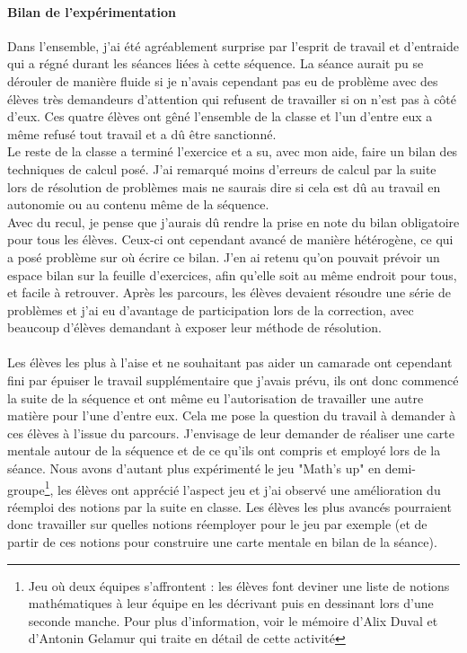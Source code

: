 \paragraph{Bilan de l'expérimentation\\}
Dans l'ensemble, j'ai été agréablement surprise par l'esprit de travail et d'entraide qui a régné durant les séances liées à cette séquence. La séance aurait pu se dérouler de manière fluide si je n'avais cependant pas eu de problème avec des élèves très demandeurs d'attention qui refusent de travailler si on n'est pas à côté d'eux. Ces quatre élèves ont gêné l'ensemble de la classe et l'un d'entre eux a même refusé tout travail et a dû être sanctionné.\\
Le reste de la classe a terminé l'exercice et a su, avec mon aide, faire un bilan des techniques de calcul posé. J'ai remarqué moins d'erreurs de calcul par la suite lors de résolution de problèmes mais ne saurais dire si cela est dû au travail en autonomie ou au contenu même de la séquence.\\
Avec du recul, je pense que j'aurais dû rendre la prise en note du bilan obligatoire pour tous les élèves. Ceux-ci ont cependant avancé de manière hétérogène, ce qui a posé problème sur où écrire ce bilan. J'en ai retenu qu'on pouvait prévoir un espace bilan sur la feuille d'exercices, afin qu'elle soit au même endroit pour tous, et facile à retrouver. Après les parcours, les élèves devaient résoudre une série de problèmes et j'ai eu d'avantage de participation lors de la correction, avec beaucoup d'élèves demandant à exposer leur méthode de résolution.
\paragraph{}Les élèves les plus à l'aise et ne souhaitant pas aider un camarade ont cependant fini par épuiser le travail supplémentaire que j'avais prévu, ils ont donc commencé la suite de la séquence et ont même eu l'autorisation de travailler une autre matière pour l'une d'entre eux. Cela me pose la question du travail à demander à ces élèves à l'issue du parcours. J'envisage de leur demander de réaliser une carte mentale autour de la séquence et de ce qu'ils ont compris et employé lors de la séance. Nous avons d'autant plus expérimenté le jeu "Math's up" en demi-groupe\footnote{Jeu où deux équipes s'affrontent : les élèves font deviner une liste de notions mathématiques à leur équipe en les décrivant puis en dessinant lors d'une seconde manche. Pour plus d'information, voir le mémoire d'Alix Duval et d'Antonin Gelamur qui traite en détail de cette activité\cite{maths_up}}, les élèves ont apprécié l'aspect jeu et j'ai observé une amélioration du réemploi des notions par la suite en classe. Les élèves les plus avancés pourraient donc travailler sur quelles notions réemployer pour le jeu par exemple (et de partir de ces notions pour construire une carte mentale en bilan de la séance).

